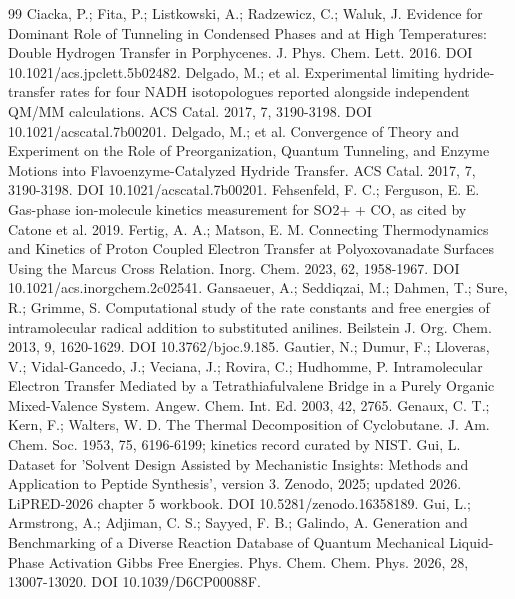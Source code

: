 \begin{thebibliography}{99}
 Ciacka, P.; Fita, P.; Listkowski, A.; Radzewicz, C.; Waluk, J. Evidence for Dominant Role of Tunneling in Condensed Phases and at High Temperatures: Double Hydrogen Transfer in Porphycenes. J. Phys. Chem. Lett. 2016. DOI 10.1021/acs.jpclett.5b02482.
 Delgado, M.; et al. Experimental limiting hydride-transfer rates for four NADH isotopologues reported alongside independent QM/MM calculations. ACS Catal. 2017, 7, 3190-3198. DOI 10.1021/acscatal.7b00201.
 Delgado, M.; et al. Convergence of Theory and Experiment on the Role of Preorganization, Quantum Tunneling, and Enzyme Motions into Flavoenzyme-Catalyzed Hydride Transfer. ACS Catal. 2017, 7, 3190-3198. DOI 10.1021/acscatal.7b00201.
 Fehsenfeld, F. C.; Ferguson, E. E. Gas-phase ion-molecule kinetics measurement for SO2+ + CO, as cited by Catone et al. 2019.
 Fertig, A. A.; Matson, E. M. Connecting Thermodynamics and Kinetics of Proton Coupled Electron Transfer at Polyoxovanadate Surfaces Using the Marcus Cross Relation. Inorg. Chem. 2023, 62, 1958-1967. DOI 10.1021/acs.inorgchem.2c02541.
 Gansaeuer, A.; Seddiqzai, M.; Dahmen, T.; Sure, R.; Grimme, S. Computational study of the rate constants and free energies of intramolecular radical addition to substituted anilines. Beilstein J. Org. Chem. 2013, 9, 1620-1629. DOI 10.3762/bjoc.9.185.
 Gautier, N.; Dumur, F.; Lloveras, V.; Vidal-Gancedo, J.; Veciana, J.; Rovira, C.; Hudhomme, P. Intramolecular Electron Transfer Mediated by a Tetrathiafulvalene Bridge in a Purely Organic Mixed-Valence System. Angew. Chem. Int. Ed. 2003, 42, 2765.
 Genaux, C. T.; Kern, F.; Walters, W. D. The Thermal Decomposition of Cyclobutane. J. Am. Chem. Soc. 1953, 75, 6196-6199; kinetics record curated by NIST.
 Gui, L. Dataset for 'Solvent Design Assisted by Mechanistic Insights: Methods and Application to Peptide Synthesis', version 3. Zenodo, 2025; updated 2026. LiPRED-2026 chapter 5 workbook. DOI 10.5281/zenodo.16358189.
 Gui, L.; Armstrong, A.; Adjiman, C. S.; Sayyed, F. B.; Galindo, A. Generation and Benchmarking of a Diverse Reaction Database of Quantum Mechanical Liquid-Phase Activation Gibbs Free Energies. Phys. Chem. Chem. Phys. 2026, 28, 13007-13020. DOI 10.1039/D6CP00088F.

\end{thebibliography}
